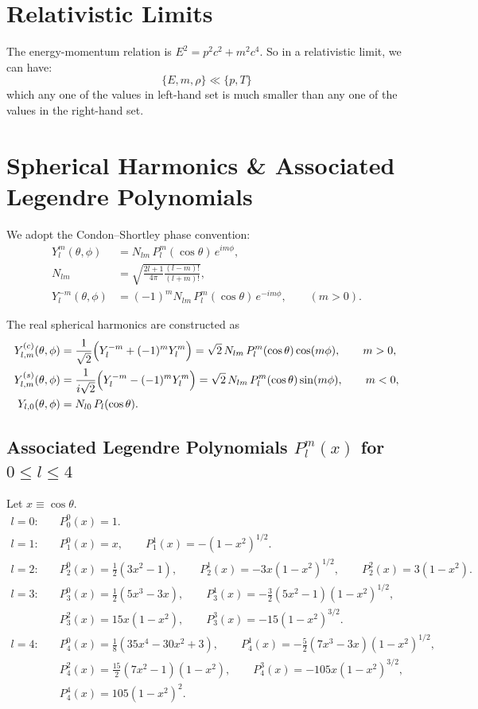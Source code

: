\section{Relativistic Limits}
The energy-momentum relation is $E^2 = p^2c^2 + m^2c^4$.
So in a relativistic limit, we can have:
\[
      \{ E, m, \rho\} \ll \{p, T\}
\]
which any one of the values in left-hand set is much smaller than any one of the values in the right-hand set.

\clearpage
\section{Spherical Harmonics \& Associated Legendre Polynomials}

We adopt the Condon--Shortley phase convention:
\begin{align*}
      Y_l^m(\theta,\phi) &= N_{lm}\,P_l^m(\cos\theta)\,e^{im\phi},\\
      N_{lm} &= \sqrt{\frac{2l+1}{4\pi}\frac{(l-m)!}{(l+m)!}},\\
      Y_l^{-m}(\theta,\phi) &= (-1)^m N_{lm}\,P_l^m(\cos\theta)\,e^{-im\phi},\qquad (m>0).
\end{align*}

The real spherical harmonics are constructed as
\begin{align*}
      Y_{l,m}^{(c)}(\theta,\phi) &= \frac{1}{\sqrt2}\Bigl(Y_l^{-m}+(-1)^mY_l^m\Bigr)
      = \sqrt2\,N_{lm}\,P_l^m(\cos\theta)\cos(m\phi),\qquad m>0,\\
      Y_{l,m}^{(s)}(\theta,\phi) &= \frac{1}{i\sqrt2}\Bigl(Y_l^{-m}-(-1)^mY_l^m\Bigr)
      = \sqrt2\,N_{lm}\,P_l^m(\cos\theta)\sin(m\phi),\qquad m<0,\\
      Y_{l,0}(\theta,\phi) &= N_{l0}\,P_l(\cos\theta).
\end{align*}

\subsection*{Associated Legendre Polynomials $P_l^m(x)$ for $0\le l\le4$}
Let $x\equiv\cos\theta$.
\begin{align*}
      l=0:&\quad P_0^0(x)=1.\\
      l=1:&\quad P_1^0(x)=x,\qquad P_1^1(x)=-(1-x^2)^{1/2}.\\
      l=2:&\quad P_2^0(x)=\tfrac12(3x^2-1),\qquad P_2^1(x)=-3x(1-x^2)^{1/2},\qquad P_2^2(x)=3(1-x^2).\\
      l=3:&\quad P_3^0(x)=\tfrac12(5x^3-3x),\qquad P_3^1(x)=-\tfrac32(5x^2-1)(1-x^2)^{1/2},\\
                  &\quad P_3^2(x)=15x(1-x^2),\qquad P_3^3(x)=-15(1-x^2)^{3/2}.\\
      l=4:&\quad P_4^0(x)=\tfrac18(35x^4-30x^2+3),\qquad P_4^1(x)=-\tfrac52(7x^3-3x)(1-x^2)^{1/2},\\
                  &\quad P_4^2(x)=\tfrac{15}{2}(7x^2-1)(1-x^2),\qquad P_4^3(x)=-105x(1-x^2)^{3/2},\\
                  &\quad P_4^4(x)=105(1-x^2)^2.
\end{align*}

